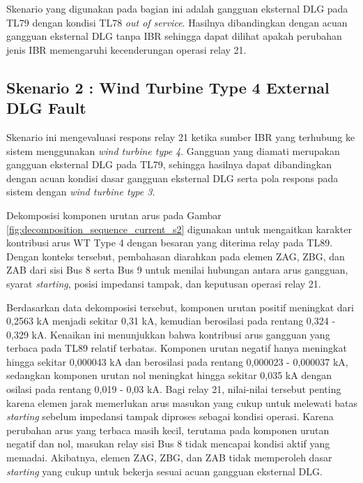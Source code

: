 Skenario yang digunakan pada bagian ini adalah gangguan eksternal DLG pada TL79 dengan kondisi TL78 \textit{out of service}. Hasilnya dibandingkan dengan acuan gangguan eksternal DLG tanpa IBR sehingga dapat dilihat apakah perubahan jenis IBR memengaruhi kecenderungan operasi relay 21.

\subsection{Skenario 2 : Wind Turbine Type 4 External DLG Fault}

Skenario ini mengevaluasi respons relay 21 ketika sumber IBR yang terhubung ke sistem menggunakan \textit{wind turbine type 4}. Gangguan yang diamati merupakan gangguan eksternal DLG pada TL79, sehingga hasilnya dapat dibandingkan dengan acuan kondisi dasar gangguan eksternal DLG serta pola respons pada sistem dengan \textit{wind turbine type 3}.

Dekomposisi komponen urutan arus pada Gambar \ref{fig:decomposition_sequence_current_s2} digunakan untuk mengaitkan karakter kontribusi arus WT Type 4 dengan besaran yang diterima relay pada TL89. Dengan konteks tersebut, pembahasan diarahkan pada elemen ZAG, ZBG, dan ZAB dari sisi Bus 8 serta Bus 9 untuk menilai hubungan antara arus gangguan, syarat \textit{starting}, posisi impedansi tampak, dan keputusan operasi relay 21.

Berdasarkan data dekomposisi tersebut, komponen urutan positif meningkat dari 0,2563 kA menjadi sekitar 0,31 kA, kemudian berosilasi pada rentang 0,324 - 0,329 kA. Kenaikan ini menunjukkan bahwa kontribusi arus gangguan yang terbaca pada TL89 relatif terbatas. Komponen urutan negatif hanya meningkat hingga sekitar 0,000043 kA dan berosilasi pada rentang 0,000023 - 0,000037 kA, sedangkan komponen urutan nol meningkat hingga sekitar 0,035 kA dengan osilasi pada rentang 0,019 - 0,03 kA. Bagi relay 21, nilai-nilai tersebut penting karena elemen jarak memerlukan arus masukan yang cukup untuk melewati batas \textit{starting} sebelum impedansi tampak diproses sebagai kondisi operasi. Karena perubahan arus yang terbaca masih kecil, terutama pada komponen urutan negatif dan nol, masukan relay sisi Bus 8 tidak mencapai kondisi aktif yang memadai. Akibatnya, elemen ZAG, ZBG, dan ZAB tidak memperoleh dasar \textit{starting} yang cukup untuk bekerja sesuai acuan gangguan eksternal DLG.



